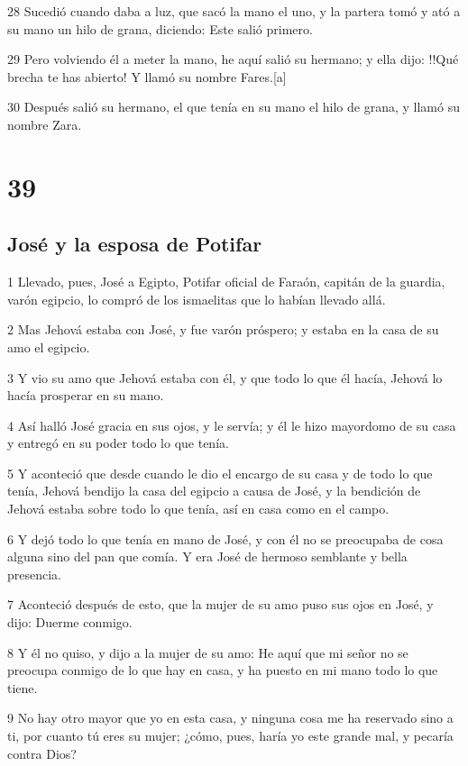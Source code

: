 28 Sucedió cuando daba a luz, que sacó la mano el uno, y la partera tomó y ató a su mano un hilo de grana, diciendo: Este salió primero.

29 Pero volviendo él a meter la mano, he aquí salió su hermano; y ella dijo: !!Qué brecha te has abierto! Y llamó su nombre Fares.[a]

30 Después salió su hermano, el que tenía en su mano el hilo de grana, y llamó su nombre Zara.

\chapter{39}

\section{José y la esposa de Potifar}

1 Llevado, pues, José a Egipto, Potifar oficial de Faraón, capitán de la guardia, varón egipcio, lo compró de los ismaelitas que lo habían llevado allá.

2 Mas Jehová estaba con José, y fue varón próspero; y estaba en la casa de su amo el egipcio.

3 Y vio su amo que Jehová estaba con él, y que todo lo que él hacía, Jehová lo hacía prosperar en su mano.

4 Así halló José gracia en sus ojos, y le servía; y él le hizo mayordomo de su casa y entregó en su poder todo lo que tenía.

5 Y aconteció que desde cuando le dio el encargo de su casa y de todo lo que tenía, Jehová bendijo la casa del egipcio a causa de José, y la bendición de Jehová estaba sobre todo lo que tenía, así en casa como en el campo.

6 Y dejó todo lo que tenía en mano de José, y con él no se preocupaba de cosa alguna sino del pan que comía. Y era José de hermoso semblante y bella presencia.

7 Aconteció después de esto, que la mujer de su amo puso sus ojos en José, y dijo: Duerme conmigo.

8 Y él no quiso, y dijo a la mujer de su amo: He aquí que mi señor no se preocupa conmigo de lo que hay en casa, y ha puesto en mi mano todo lo que tiene.

9 No hay otro mayor que yo en esta casa, y ninguna cosa me ha reservado sino a ti, por cuanto tú eres su mujer; ¿cómo, pues, haría yo este grande mal, y pecaría contra Dios?

